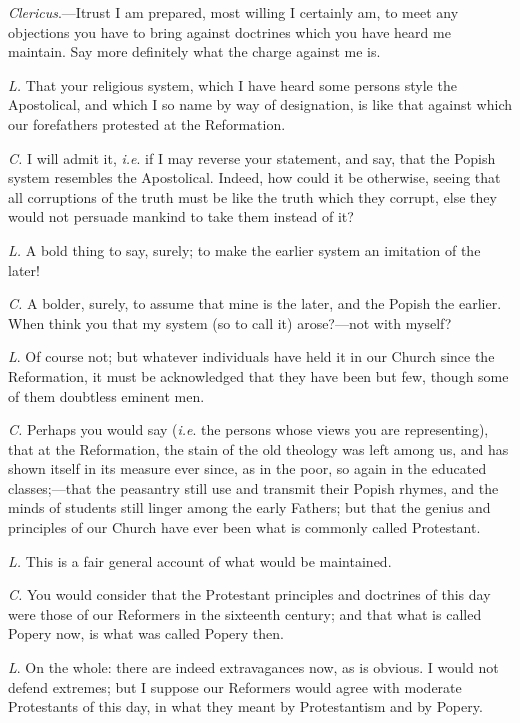 \emph{Clericus}.—I\emph{}trust I am prepared, most willing I certainly am, to meet any
objections you have to bring against doctrines which you have heard me
maintain. Say more definitely what the charge against me is.

\emph{L.}
That your religious system, which I have heard some persons
style the Apostolical, and which I so name by way of designation, is
like that against which our forefathers protested at the Reformation.

\emph{C.}
I will admit it, \emph{i.e}. if I may reverse your statement, and say, that the Popish
system resembles the Apostolical. Indeed, how could it be otherwise,
seeing that all corruptions of the truth must be like the truth which
they corrupt, else they would not persuade mankind to take them
instead of it?

\emph{L.}
A bold thing to say, surely; to make the earlier system an
imitation of the later!

\emph{C.}
A bolder, surely, to assume that mine is the later, and the
Popish the earlier. When think you that my system (so to call it)
arose?—not with myself?

\emph{L}. Of course not; but whatever individuals
have held it in our Church since the Reformation, it must be
acknowledged that they have been but few, though some of them
doubtless eminent men.

\emph{C.}
Perhaps you would say (\emph{i.e}.
the persons whose views you are representing), that at the
Reformation, the stain of the old theology was left among us, and has
shown itself in its measure ever since, as in the poor, so again in
the educated classes;—that the peasantry still use and transmit
their Popish rhymes, and the minds of students still linger among the
early Fathers; but that the genius and principles of our Church have
ever been what is commonly called Protestant.

\emph{L.}
This is a fair general account of what would be maintained.

\emph{C.}
You would consider that the Protestant principles and doctrines
of this day were those of our Reformers in the sixteenth century; and
that what is called Popery now, is what was called Popery then.

\emph{L}. On the whole: there are indeed
extravagances now, as is obvious. I would not defend extremes; but I
suppose our Reformers would agree with moderate Protestants of this
day, in what they meant by Protestantism and by Popery.

